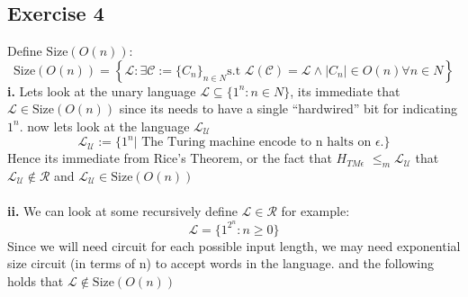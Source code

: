 \documentclass[12pt]{article}
\begin{document}
\subsection{Exercise 4}
Define $\text{Size}(O(n))$: \[
\text{Size}(O(n)) = \left\lbrace
\mathcal{L} :\exists \mathcal{C}:=\{C_n\}_{n\in N}\text{
s.t } \mathcal{L(C)=L} \wedge |C_n|\in O(n)  \forall n\in N
\right\rbrace
\]
\textbf{i. } Lets look at the unary language 
$\mathcal{L} \subseteq \{1^n: n \in N \}$, its immediate  that $\mathcal{L}\in\text{Size}(O(n)) $ since its needs to have a single “hardwired”
bit for indicating $1^n$. now lets look at the language $\mathcal{L_U}$
\[ \mathcal{L_U} := \{1^
n | \text{ The Turing machine encode to n halts on $\epsilon$.}\}
\]
Hence its immediate from Rice’s Theorem, or the fact that $
H_{TM\epsilon}$ $\leq_m \mathcal{L_U}$
that $\mathcal{L_U} \notin \mathcal{R}$ and $\mathcal{L_U}\in\text{Size}(O(n)) $
\\\\\textbf{ii. } We can look at some recursively   define $\mathcal{L}\in \mathcal{R}$ for example: \[
\mathcal{L} =\{1^{2^n} : n\geq0 \}
\] Since we will need circuit for each possible input length, we  may need exponential size circuit (in terms of n) to accept words in the  language.  and the following holds that $\mathcal{L} \notin \text{Size}(O(n)) $
\end{document}
